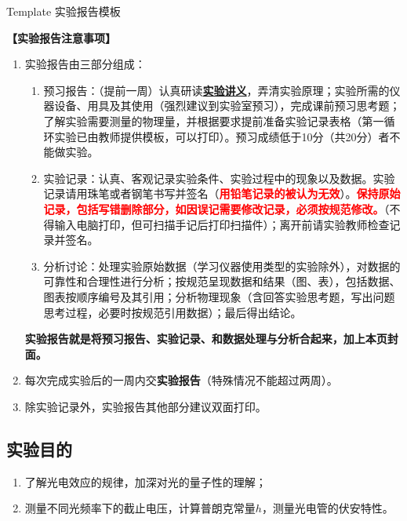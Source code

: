 \documentclass[dvipsnames, svgnames,a4paper,11pt]{article}
\begin{document}
\scoresTable{}{}{}{}{}{}{}{}


\begin{center}
	\LARGE Template \quad 实验报告模板
\end{center}

\textbf{【实验报告注意事项】}
\begin{enumerate}
	\item 实验报告由三部分组成：
	\begin{enumerate}
		\item 预习报告：（提前一周）认真研读\underline{\textbf{实验讲义}}，弄清实验原理；实验所需的仪器设备、用具及其使用（强烈建议到实验室预习），完成课前预习思考题；了解实验需要测量的物理量，并根据要求提前准备实验记录表格（第一循环实验已由教师提供模板，可以打印）。预习成绩低于10分（共20分）者不能做实验。
	    \item 实验记录：认真、客观记录实验条件、实验过程中的现象以及数据。实验记录请用珠笔或者钢笔书写并签名（\textcolor{red}{\textbf{用铅笔记录的被认为无效}}）。\textcolor{red}{\textbf{保持原始记录，包括写错删除部分，如因误记需要修改记录，必须按规范修改。}}（不得输入电脑打印，但可扫描手记后打印扫描件）；离开前请实验教师检查记录并签名。
	    \item 分析讨论：处理实验原始数据（学习仪器使用类型的实验除外），对数据的可靠性和合理性进行分析；按规范呈现数据和结果（图、表），包括数据、图表按顺序编号及其引用；分析物理现象（含回答实验思考题，写出问题思考过程，必要时按规范引用数据）；最后得出结论。
	\end{enumerate}
	\textbf{实验报告就是将预习报告、实验记录、和数据处理与分析合起来，加上本页封面。}
	\item 每次完成实验后的一周内交\textbf{实验报告}（特殊情况不能超过两周）。
	\item 除实验记录外，实验报告其他部分建议双面打印。
\end{enumerate}


\clearpage
\tableofcontents
\clearpage

\setcounter{section}{0}
	
\subsection{实验目的}
\begin{enumerate}
	\item 了解光电效应的规律，加深对光的量子性的理解；
	\item 测量不同光频率下的截止电压，计算普朗克常量$h$，测量光电管的伏安特性。
\end{enumerate}
\end{document}
